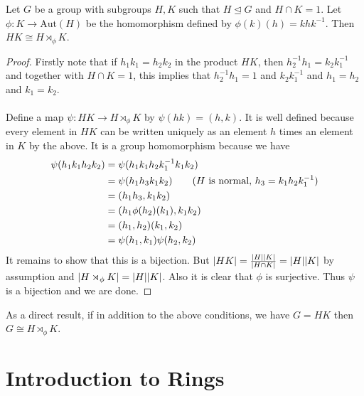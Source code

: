 \documentclass[a4paper]{article}
\begin{document}
\begin{thm}{}{} Let $G$ be a group with subgroups $H,K$ such that $H\trianglelefteq G$ and $H\cap K=1$. Let $\phi:K\to\text{Aut}(H)$ be the homomorphism defined by $\phi(k)(h)=khk^{-1}$. Then $HK\cong H\rtimes_\phi K$. \tcbline
\begin{proof}
Firstly note that if $h_1k_1=h_2k_2$ in the product $HK$, then $h_2^{-1}h_1=k_2k_1^{-1}$ and together with $H\cap K=1$, this implies that $h_2^{-1}h_1=1$ and $k_2k_1^{-1}$ and $h_1=h_2$ and $k_1=k_2$. \\~\\

Define a map $\psi:HK\to H\rtimes_\phi K$ by $\psi(hk)=(h,k)$. It is well defined because every element in $HK$ can be written uniquely as an element $h$ times an element in $K$ by the above. It is a group homomorphism because we have 
\begin{align*}
\psi(h_1k_1h_2k_2)&=\psi(h_1k_1h_2k_1^{-1}k_1k_2)\\
&=\psi(h_1h_3k_1k_2)\tag{$H$ is normal, $h_3=k_1h_2k_1^{-1}$}\\
&=(h_1h_3,k_1k_2)\\
&=(h_1\phi(h_2)(k_1),k_1k_2)\\
&=(h_1,h_2)(k_1,k_2)\\
&=\psi(h_1,k_1)\psi(h_2,k_2)
\end{align*}
It remains to show that this is a bijection. But $\abs{HK}=\frac{\abs{H}\abs{K}}{\abs{H\cap K}}=\abs{H}\abs{K}$ by assumption and $\abs{H\rtimes_\phi K}=\abs{H}\abs{K}$. Also it is clear that $\phi$ is surjective. Thus $\psi$ is a bijection and we are done. 
\end{proof}
\end{thm}

As a direct result, if in addition to the above conditions, we have $G=HK$ then $G\cong H\rtimes_\phi K$. 

\pagebreak
\section{Introduction to Rings}
\end{document}
